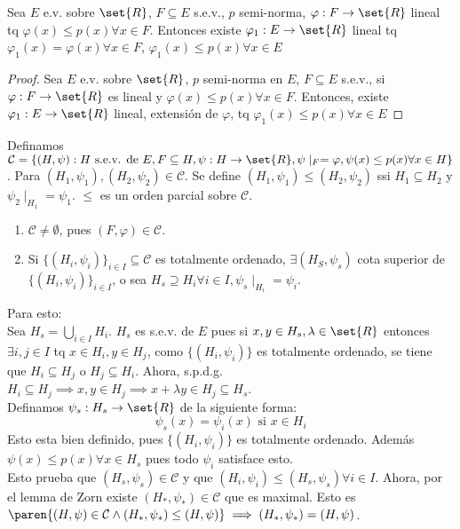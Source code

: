 \documentclass{notetaking}
\begin{document}
\begin{thm}
    Sea \(E\) e.v. sobre \(\set{R}\), \(F\subseteq E\) s.e.v., \(p\) semi-norma, \(\varphi:F\rightarrow\set{R}\) lineal tq \(\varphi(x)\leq p(x)\forall x\in F\). Entonces existe \(\varphi_1:E\rightarrow\set{R}\) lineal tq \(\varphi_1(x)=\varphi(x)\forall x\in F\), \(\varphi_1(x)\leq p(x)\forall x\in E\)
\end{thm}
\begin{proof}
    Sea \(E\) e.v. sobre \(\set{R}\), \(p\) semi-norma en \(E\), \(F\subseteq E\) s.e.v., si \(\varphi:F\rightarrow \set{R}\) es lineal y \(\varphi(x)\leq p(x)\forall x\in F\). Entonces, existe \(\varphi_1:E\rightarrow\set{R}\) lineal, extensión de \(\varphi\), tq \(\varphi_1(x)\leq p(x)\forall x\in E\)
\end{proof}
Definamos \(\mathcal{C}=\{(H,\psi): H\text{ s.e.v. de }E, F\subseteq H,\psi:H\rightarrow\set{R},\psi\mid_F=\varphi,\psi(x)\leq p(x) \forall x\in H\}\). Para \((H_1,\psi_1),(H_2,\psi_2)\in \mathcal{C}\). Se define \((H_1,\psi_1)\leq(H_2,\psi_2)\) ssi \(H_1\subseteq H_2\) y \(\psi_2\mid_{H_1}=\psi_1\). \(\leq\) es un orden parcial sobre \(\mathcal{C}\).
\begin{enumerate}
    \item \(\mathcal{C}\neq\emptyset\), pues \((F,\varphi)\in\mathcal{C}\).
    \item Si  \(\{(H_i,\psi_i)\}_{i\in I}\subseteq\mathcal{C}\) es totalmente ordenado, \(\exists (H_S,\psi_s)\) cota superior de \(\{(H_i,\psi_i)\}_{i\in I}\), o sea \(H_s\supseteq H_i\forall i\in I, \psi_s\mid_{H_i}=\psi_i\).
\end{enumerate}
Para esto:\\
Sea \(H_s=\bigcup_{i\in I}H_i\). \(H_s\) es s.e.v. de \(E\) pues si \(x,y\in H_s,\lambda\in\set{R}\) entonces \(\exists i,j\in I\) tq \(x\in H_i,y\in H_j\), como \(\{(H_i,\psi_i)\}\) es totalmente ordenado, se tiene que \(H_i\subseteq H_j\) o \(H_j\subseteq H_i\). Ahora, s.p.d.g. \(H_i\subseteq H_j\implies x,y\in H_j\implies x+\lambda y\in H_j\subseteq H_s\).\\
Definamos \(\psi_s:H_s\rightarrow\set{R}\) de la siguiente forma:
\[
    \psi_s(x)=\psi_i(x)\text{ si }x\in H_i
\]
Esto esta bien definido, pues \(\{(H_i,\psi_i)\}\) es totalmente ordenado. Además \(\psi(x)\leq p(x)\forall x\in H_s\) pues todo \(\psi_i\) satisface esto.\\
Esto prueba que \((H_s,\psi_s)\in\mathcal{C}\) y que \((H_i,\psi_i)\leq (H_s,\psi_s)\forall i\in I\). Ahora, por el lemma de Zorn existe \((H_*,\psi_*)\in\mathcal{C}\) que es maximal. Esto es \(\paren{(H,\psi)\in\mathcal{C}\wedge (H_*,\psi_*)\leq (H,\psi)}\implies (H_*,\psi_*)=(H,\psi)\).\\
\end{document}

